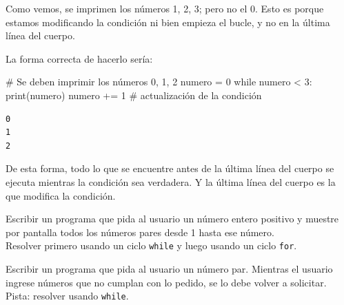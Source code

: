 \documentclass[
  letterpaper,
  DIV=11,
  numbers=noendperiod]{scrreprt}
\newenvironment{Shaded}{\begin{snugshade}}{\end{snugshade}}
\newcommand{\BuiltInTok}[1]{\textcolor[rgb]{0.00,0.23,0.31}{#1}}
\newcommand{\CommentTok}[1]{\textcolor[rgb]{0.37,0.37,0.37}{#1}}
\newcommand{\ControlFlowTok}[1]{\textcolor[rgb]{0.00,0.23,0.31}{#1}}
\newcommand{\DecValTok}[1]{\textcolor[rgb]{0.68,0.00,0.00}{#1}}
\newcommand{\NormalTok}[1]{\textcolor[rgb]{0.00,0.23,0.31}{#1}}
\newcommand{\OperatorTok}[1]{\textcolor[rgb]{0.37,0.37,0.37}{#1}}
\begin{document}
Como vemos, se imprimen los números 1, 2, 3; pero no el 0. Esto es
porque estamos modificando la condición ni bien empieza el bucle, y no
en la última línea del cuerpo.

La forma correcta de hacerlo sería:

\begin{Shaded}
\begin{Highlighting}[]
\CommentTok{\# Se deben imprimir los números 0, 1, 2}
\NormalTok{numero }\OperatorTok{=} \DecValTok{0}
\ControlFlowTok{while}\NormalTok{ numero }\OperatorTok{\textless{}} \DecValTok{3}\NormalTok{:}
  \BuiltInTok{print}\NormalTok{(numero)}
\NormalTok{  numero }\OperatorTok{+=} \DecValTok{1}     \CommentTok{\# actualización de la condición}
\end{Highlighting}
\end{Shaded}

\begin{verbatim}
0
1
2
\end{verbatim}

De esta forma, todo lo que se encuentre antes de la última línea del
cuerpo se ejecuta mientras la condición sea verdadera. Y la última línea
del cuerpo es la que modifica la condición.

\hfill\break
\hfill\break

\begin{tcolorbox}[enhanced jigsaw, bottomrule=.15mm, leftrule=.75mm, opacityback=0, colback=white, toprule=.15mm, bottomtitle=1mm, opacitybacktitle=0.6, rightrule=.15mm, left=2mm, arc=.35mm, coltitle=black, title=\textcolor{quarto-callout-warning-color}{\faExclamationTriangle}\hspace{0.5em}{Ejercicio Desafío}, breakable, toptitle=1mm, colframe=quarto-callout-warning-color-frame, titlerule=0mm, colbacktitle=quarto-callout-warning-color!10!white]

Escribir un programa que pida al usuario un número entero positivo y
muestre por pantalla todos los números pares desde 1 hasta ese número.\\
Resolver primero usando un ciclo \texttt{while} y luego usando un ciclo
\texttt{for}.

\end{tcolorbox}

\begin{tcolorbox}[enhanced jigsaw, bottomrule=.15mm, leftrule=.75mm, opacityback=0, colback=white, toprule=.15mm, bottomtitle=1mm, opacitybacktitle=0.6, rightrule=.15mm, left=2mm, arc=.35mm, coltitle=black, title=\textcolor{quarto-callout-warning-color}{\faExclamationTriangle}\hspace{0.5em}{Ejercicio Desafío}, breakable, toptitle=1mm, colframe=quarto-callout-warning-color-frame, titlerule=0mm, colbacktitle=quarto-callout-warning-color!10!white]

Escribir un programa que pida al usuario un número par. Mientras el
usuario ingrese números que no cumplan con lo pedido, se lo debe volver
a solicitar.\\
Pista: resolver usando \texttt{while}.

\end{tcolorbox}
\end{document}
